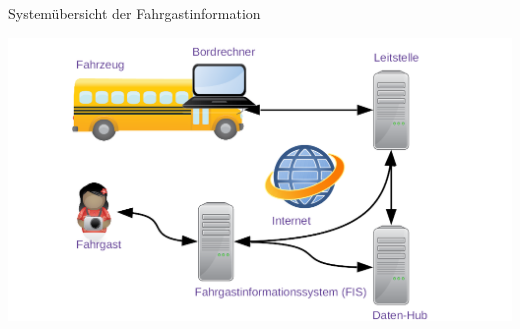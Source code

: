 
\begin{frame}{Systemübersicht der Fahrgastinformation}
  \begin{center}
    \includegraphics[width=1.1\textwidth]{public-transport/public-transport.png}
  \end{center}
\end{frame}
